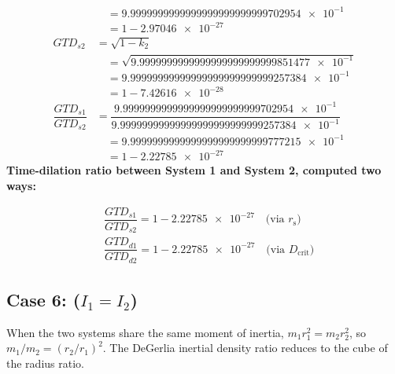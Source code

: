 \documentclass[twoside,twocolumn,9pt,fleqn]{article}
\begin{document}
\begin{mdframed}
\begin{align*}
&\quad = \num{9.9999999999999999999999999702954e-1}\\
&\quad = 1-\num{2.97046e-27}\\
GTD_{s2} &= \sqrt{1-k_2}\\
&\quad = \sqrt{\num{9.9999999999999999999999999851477e-1}}\\
&\quad = \num{9.99999999999999999999999999257384e-1}\\
&\quad = 1-\num{7.42616e-28}\\
\dfrac{GTD_{s1}}{GTD_{s2}} &= \dfrac{\num{9.9999999999999999999999999702954e-1}}{\num{9.99999999999999999999999999257384e-1}}\\
&\quad = \num{9.9999999999999999999999999777215e-1}\\
&\quad = 1-\num{2.22785e-27}
\end{align*}
\noindent\textbf{Time-dilation ratio between System 1 and System 2, computed two ways:}\par
\begin{align*}
&\dfrac{GTD_{s1}}{GTD_{s2}} = 1-\num{2.22785e-27} \quad \text{(via $r_{\mathrm{s}}$)}\\
&\dfrac{GTD_{d1}}{GTD_{d2}} = 1-\num{2.22785e-27} \quad \text{(via $D_{\mathrm{crit}}$)}
\end{align*}
\end{mdframed}

\newpage
\subsection{Case 6: ($I_1 = I_2$)}

When the two systems share the same moment of inertia, $m_1 r_1^2 = m_2 r_2^2$, so $m_1/m_2 = (r_2/r_1)^2$.
The DeGerlia inertial density ratio reduces to the cube of the radius ratio.
\end{document}
